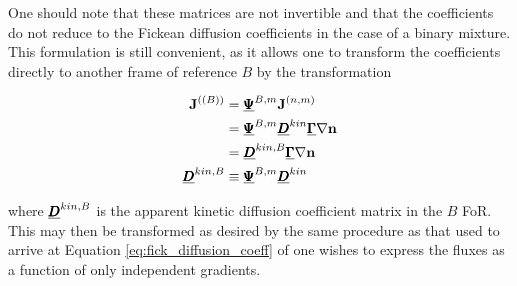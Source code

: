 One should note that these matrices are not invertible and that the coefficients do not reduce to the Fickean diffusion coefficients in the case of a binary mixture. This formulation is still convenient, as it allows one to transform the coefficients directly to another frame of reference $B$ by the transformation

\begin{equation}
    \begin{split}
        \boldsymbol{\mathrm{J}}_{}^{((B))} &= \underline{\pmb{\Psi}}^{B, m} \boldsymbol{\mathrm{J}}^{(n,m)} \\
        &= \underline{\pmb{\Psi}}^{B, m} \underline{\pmb{D}}^{kin} \underline{\pmb{\Gamma}} \nabla \boldsymbol{\mathrm{n}} \\
        &= \underline{\pmb{D}}^{kin, B} \underline{\pmb{\Gamma}} \nabla \boldsymbol{\mathrm{n}} \\
        \underline{\pmb{D}}^{kin, B} &\equiv \underline{\pmb{\Psi}}^{B, m} \underline{\pmb{D}}^{kin}
    \end{split}
\end{equation}

where $\underline{\pmb{D}}^{kin, B}$ is the apparent kinetic diffusion coefficient matrix in the $B$ FoR. This may then be transformed as desired by the same procedure as that used to arrive at Equation \eqref{eq:fick_diffusion_coeff} of one wishes to express the fluxes as a function of only independent gradients.